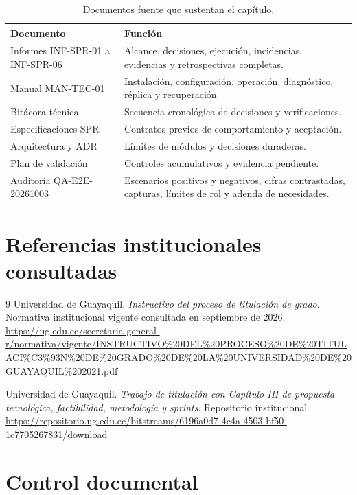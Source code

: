 \documentclass[11pt,letterpaper]{article}
\begin{document}
\begin{table}[ht]
\centering
\caption{Documentos fuente que sustentan el capítulo.}
\begin{tabularx}{\textwidth}{@{}p{}X@{}}
  \toprule
  Documento & Función \\
  \midrule
  Informes INF-SPR-01 a INF-SPR-06 & Alcance, decisiones, ejecución, incidencias, evidencias y retrospectivas completas. \\
  Manual MAN-TEC-01 & Instalación, configuración, operación, diagnóstico, réplica y recuperación. \\
  Bitácora técnica & Secuencia cronológica de decisiones y verificaciones. \\
  Especificaciones SPR & Contratos previos de comportamiento y aceptación. \\
  Arquitectura y ADR & Límites de módulos y decisiones duraderas. \\
  Plan de validación & Controles acumulativos y evidencia pendiente. \\
  Auditoría QA-E2E-20261003 & Escenarios positivos y negativos, cifras contrastadas, capturas, límites de rol y adenda de necesidades. \\
  \bottomrule
\end{tabularx}
\end{table}

\section*{Referencias institucionales consultadas}

\begin{thebibliography}{9}
Universidad de Guayaquil. \emph{Instructivo del proceso de titulación de grado}. Normativa institucional vigente consultada en septiembre de 2026. \url{https://ug.edu.ec/secretaria-general-r/normativa/vigente/INSTRUCTIVO%20DEL%20PROCESO%20DE%20TITULACI%C3%93N%20DE%20GRADO%20DE%20LA%20UNIVERSIDAD%20DE%20GUAYAQUIL%202021.pdf}

Universidad de Guayaquil. \emph{Trabajo de titulación con Capítulo III de propuesta tecnológica, factibilidad, metodología y sprints}. Repositorio institucional. \url{https://repositorio.ug.edu.ec/bitstreams/6196a0d7-4c4a-4503-bf50-1c7705267831/download}
\end{thebibliography}

\section*{Control documental}
\end{document}
